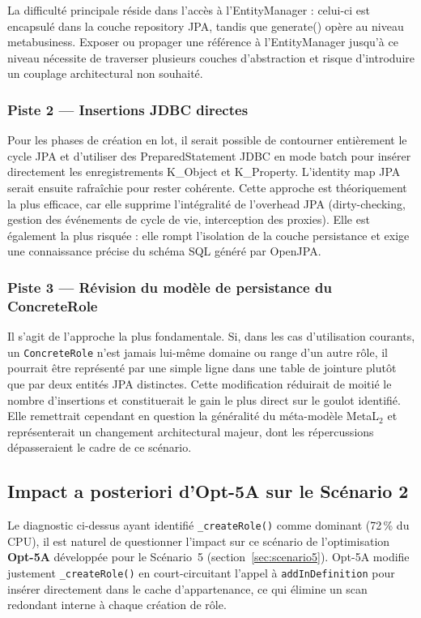 La difficulté principale réside dans l'accès à l'EntityManager : celui-ci est encapsulé dans la couche repository JPA, tandis que generate() opère au niveau metabusiness. Exposer ou propager une référence à l'EntityManager jusqu'à ce niveau nécessite de traverser plusieurs couches d'abstraction et risque d'introduire un couplage architectural non souhaité.

\subsubsection{Piste 2 — Insertions JDBC directes}

Pour les phases de création en lot, il serait possible de contourner entièrement le cycle JPA et d'utiliser des PreparedStatement JDBC en mode batch pour insérer directement les enregistrements K\_Object et K\_Property. L'identity map JPA serait ensuite rafraîchie pour rester cohérente. Cette approche est théoriquement la plus efficace, car elle supprime l'intégralité de l'overhead JPA (dirty-checking, gestion des événements de cycle de vie, interception des proxies). Elle est également la plus risquée : elle rompt l'isolation de la couche persistance et exige une connaissance précise du schéma SQL généré par OpenJPA.

\subsubsection{Piste 3 — Révision du modèle de persistance du ConcreteRole}

Il s'agit de l'approche la plus fondamentale. Si, dans les cas d'utilisation courants, un \texttt{ConcreteRole} n'est jamais lui-même domaine ou range d'un autre rôle, il pourrait être représenté par une simple ligne dans une table de jointure plutôt que par deux entités JPA distinctes. Cette modification réduirait de moitié le nombre d'insertions et constituerait le gain le plus direct sur le goulot identifié. Elle remettrait cependant en question la généralité du méta-modèle MetaL$_2$ et représenterait un changement architectural majeur, dont les répercussions dépasseraient le cadre de ce scénario.

\subsection{Impact a posteriori d'Opt-5A sur le Scénario 2}
\label{sec:scenario2-opt5a}

Le diagnostic ci-dessus ayant identifié \texttt{\_createRole()} comme dominant
(72\,\% du CPU), il est naturel de questionner l'impact sur ce scénario de
l'optimisation \textbf{Opt-5A} développée pour le Scénario~5
(section~\ref{sec:scenario5}). Opt-5A modifie justement
\texttt{\_createRole()} en court-circuitant l'appel à \texttt{addInDefinition}
pour insérer directement dans le cache d'appartenance, ce qui élimine un
scan redondant interne à chaque création de rôle.


